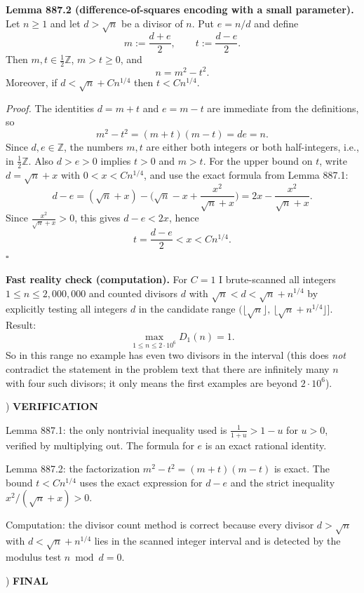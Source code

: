 \medskip
\noindent \textbf{Lemma 887.2 (difference-of-squares encoding with a small parameter).}
Let $n\ge 1$ and let $d>\sqrt n$ be a divisor of $n$. Put $e=n/d$ and define
\[
 m:=\frac{d+e}{2},\qquad t:=\frac{d-e}{2}.
\]
Then $m,t\in \tfrac12\mathbb{Z}$, $m>t\ge 0$, and
\[
 n = m^2 - t^2.
\]
Moreover, if $d < \sqrt n + Cn^{1/4}$ then $t < C n^{1/4}$.

\noindent\emph{Proof.}
The identities $d=m+t$ and $e=m-t$ are immediate from the definitions, so
\[
 m^2-t^2 = (m+t)(m-t)=de=n.
\]
Since $d,e\in\mathbb{Z}$, the numbers $m,t$ are either both integers or both half-integers, i.e., in $\tfrac12\mathbb{Z}$. Also $d>e>0$ implies $t>0$ and $m>t$.
For the upper bound on $t$, write $d=\sqrt n + x$ with $0<x<Cn^{1/4}$, and use the exact formula from Lemma 887.1:
\[
 d-e = (\sqrt n + x) - \Big(\sqrt n - x + \frac{x^2}{\sqrt n + x}\Big)
 = 2x - \frac{x^2}{\sqrt n + x}.
\]
Since $\frac{x^2}{\sqrt n + x}>0$, this gives $d-e<2x$, hence
\[
 t=\frac{d-e}{2} < x < Cn^{1/4}.
\]
\hfill$\square$

\medskip
\noindent \textbf{Fast reality check (computation).}
For $C=1$ I brute-scanned all integers $1\le n\le 2{,}000{,}000$ and counted divisors $d$ with $\sqrt n<d<\sqrt n+n^{1/4}$ by explicitly testing all integers $d$ in the candidate range $(\lfloor\sqrt n\rfloor,\,\lfloor \sqrt n+n^{1/4}\rfloor]$. Result:
\[
\max_{1\le n\le 2\cdot 10^6} D_1(n) = 1.
\]
So in this range no example has even two divisors in the interval (this does \emph{not} contradict the statement in the problem text that there are infinitely many $n$ with four such divisors; it only means the first examples are beyond $2\cdot 10^6$).

) \textbf{VERIFICATION}

\noindent Lemma 887.1: the only nontrivial inequality used is $\frac1{1+u}>1-u$ for $u>0$, verified by multiplying out. The formula for $e$ is an exact rational identity.

\noindent Lemma 887.2: the factorization $m^2-t^2=(m+t)(m-t)$ is exact. The bound $t<Cn^{1/4}$ uses the exact expression for $d-e$ and the strict inequality $x^2/(\sqrt n+x)>0$.

\noindent Computation: the divisor count method is correct because every divisor $d>\sqrt n$ with $d<\sqrt n+n^{1/4}$ lies in the scanned integer interval and is detected by the modulus test $n\bmod d=0$.

) \textbf{FINAL}

